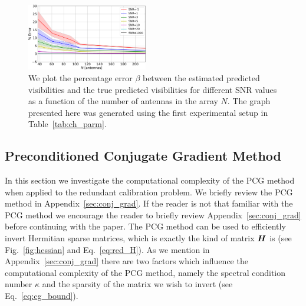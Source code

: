 \documentclass[useAMS,usenatbib]{mn2e}
\newcommand{\bH}{\bmath{H}}
\begin{document}
\begin{figure}
\includegraphics[width=0.47\textwidth]{./prec_error.pdf} 
\caption{We plot the percentage error $\beta$ between the estimated 
predicted visibilities and the true predicted visibilities for different SNR values as a function of the number of antennas in the array $N$. The graph presented here was generated using the first experimental setup in Table~\ref{tab:ch_parm}.}
\label{fig:prec_error}
\end{figure}

% 
% 
% 
% 
% 
% 
% 

\subsection{Preconditioned Conjugate Gradient Method}
\label{sec:pcg}
In this section we investigate the computational complexity of the PCG method when applied to the redundant calibration problem. 
We briefly review the PCG method in Appendix~\ref{sec:conj_grad}. If the reader is not that familiar with the PCG method we encourage 
the reader to briefly review Appendix~\ref{sec:conj_grad} before continuing with the paper. The PCG method can be used to efficiently invert Hermitian sparse 
matrices, which is exactly the kind of matrix $\bH$ is (see Fig.~\ref{fig:hessian} and Eq.~\ref{eq:red_H}). As we mention in Appendix~\ref{sec:conj_grad} there are two factors which influence the computational complexity of the PCG method, namely the spectral condition number $\kappa$ and the sparsity of the matrix we wish to invert (see Eq.~\eqref{eq:cg_bound}). 
\end{document}
